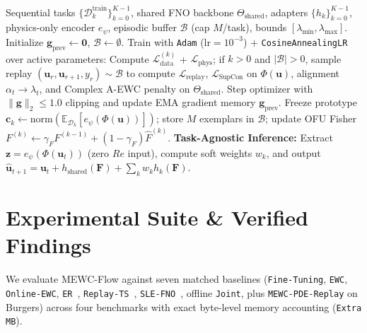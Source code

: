 \documentclass[11pt,a4paper]{article}
\begin{document}
\begin{algorithm}[!htbp]
\caption{MEWC-Flow Continual Learning \& Task-Agnostic Inference}
\label{alg:mewcflow}
\begin{algorithmic}[1]
\REQUIRE Sequential tasks $\{\mathcal{D}_k^{\text{train}}\}_{k=0}^{K-1}$, shared FNO backbone $\Theta_{\text{shared}}$, adapters $\{h_k\}_{k=0}^{K-1}$, physics-only encoder $e_{\psi}$, episodic buffer $\mathcal{B}$ (cap $M$/task), bounds $[\lambda_{\min}, \lambda_{\max}]$.
\STATE Initialize $\mathbf{g}_{\text{prev}} \gets \mathbf{0}$, $\mathcal{B} \gets \emptyset$.
  \STATE Train with \texttt{Adam} ($\text{lr}=10^{-3}$) + \texttt{CosineAnnealingLR} over active parameters:
    \STATE Compute $\mathcal{L}_{\text{data}}^{(k)}$ + $\mathcal{L}_{\text{phys}}$; if $k>0$ and $|\mathcal{B}|>0$, sample replay $(\mathbf{u}_r, \mathbf{u}_{r+1}, y_r)\sim\mathcal{B}$ to compute $\mathcal{L}_{\text{replay}}$, $\mathcal{L}_{\text{SupCon}}$ on $\Phi(\mathbf{u})$, alignment $\alpha_t \to \lambda_t$, and Complex A-EWC penalty on $\Theta_{\text{shared}}$.
    \STATE Step optimizer with $\|\mathbf{g}\|_2 \le 1.0$ clipping and update EMA gradient memory $\mathbf{g}_{\text{prev}}$.
  \ENDFOR
  \STATE Freeze prototype $\mathbf{c}_k \gets \text{norm}(\mathbb{E}_{\mathcal{D}_k}[e_{\psi}(\Phi(\mathbf{u}))])$; store $M$ exemplars in $\mathcal{B}$; update OFU Fisher $F^{(k)} \gets \gamma_F F^{(k-1)} + (1-\gamma_F)\hat{F}^{(k)}$.
\ENDFOR
\STATE \textbf{Task-Agnostic Inference:} Extract $\mathbf{z}=e_{\psi}(\Phi(\mathbf{u}_t))$ (zero $Re$ input), compute soft weights $w_k$, and output $\hat{\mathbf{u}}_{t+1} = \mathbf{u}_t + h_{\text{shared}}(\mathbf{F}) + \sum_k w_k h_k(\mathbf{F})$.
\end{algorithmic}
\end{algorithm}

\FloatBarrier
\section{Experimental Suite \& Verified Findings}

We evaluate MEWC-Flow against seven matched baselines (\texttt{Fine-Tuning}, \texttt{EWC}, \texttt{Online-EWC}, \texttt{ER}~\cite{rolnick2019er}, \texttt{Replay-TS}~\cite{hemati2026replayts}, \texttt{SLE-FNO}~\cite{elhadidy2026slefno}, offline \texttt{Joint}, plus \texttt{MEWC-PDE-Replay} on Burgers) across four benchmarks with exact byte-level memory accounting (\texttt{Extra MB}).
\end{document}
